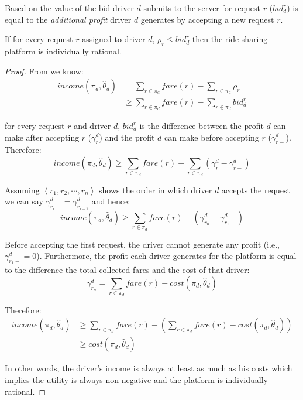 Based on  the value of the bid driver $d$ submits to the server for request $r$ ($bid_d^r$) is equal to the \emph{additional profit} driver $d$ generates by accepting a new request $r$.
\begin{theorem}
If for every request $r$ assigned to driver $d$, $\rho_r \leq bid_d^r$ then the ride-sharing platform is individually rational.
\end{theorem}
\begin{proof}
From  we know:
\begin{align*}
income(\pi_d, \hat{\theta}_d) &= \sum_{r \in \pi_d} fare(r) - \sum_{r \in \pi_d} \rho_r \\
&\geq \sum_{r \in \pi_d} fare(r) - \sum_{r \in \pi_d} bid_d^r
\end{align*}

for every request $r$ and driver $d$, $bid_d^r$ is the difference between the profit $d$ can make after accepting $r$ ($\gamma_r^d$) and the profit $d$ can make before accepting $r$ ($\gamma_{r-}^d$). Therefore:
\begin{equation*}
income(\pi_d, \hat{\theta}_d) \geq \sum_{r \in \pi_d} fare(r) - \sum_{r \in \pi_d} (\gamma_r^d - \gamma_{r-}^d)
\end{equation*}

Assuming $\left\langle r_1, r_2, \cdots, r_n \right\rangle$ shows the order in which driver $d$ accepts the request we can say $\gamma_{r_i-}^d = \gamma_{r_{i-1}}^d$ and hence:
\begin{equation*}
income(\pi_d, \hat{\theta}_d) \geq \sum_{r \in \pi_d} fare(r) - (\gamma_{r_n}^d - \gamma_{r_1-}^d)
\end{equation*}

Before accepting the first request, the driver cannot generate any profit (i.e., $\gamma_{r_1-}^d = 0$). Furthermore, the profit each driver generates for the platform is equal to the difference the total collected fares and the cost of that driver:
\begin{equation*}
\gamma_{r_n}^d = \sum_{r \in \pi_d} fare(r) - cost(\pi_d, \hat{\theta}_d)
\end{equation*}

Therefore:
\begin{align*}
income(\pi_d, \hat{\theta}_d) &\geq \sum_{r \in \pi_d} fare(r) - \left(\sum_{r \in \pi_d} fare(r) - cost(\pi_d, \hat{\theta}_d) \right) \\
&\geq cost(\pi_d, \hat{\theta}_d)
\end{align*}

In other words, the driver's income is always at least as much as his costs which implies the utility is always non-negative and the platform is individually rational.
\end{proof}

